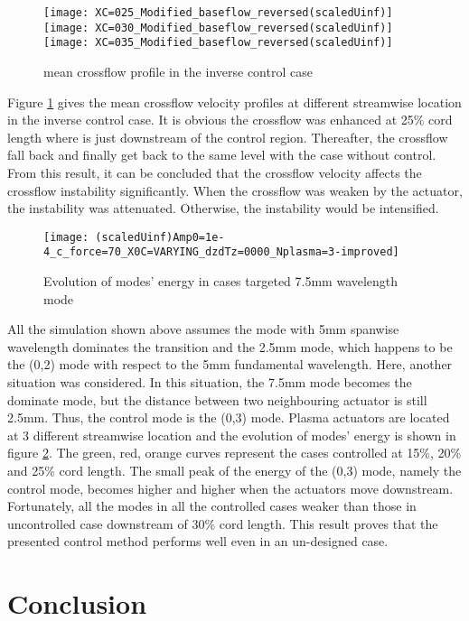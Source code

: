 \documentclass{AIAA}
\begin{document}
\begin{figure}
\centering
\texttt{[image: XC=025\_Modified\_baseflow\_reversed(scaledUinf)]}
\texttt{[image: XC=030\_Modified\_baseflow\_reversed(scaledUinf)]}
\texttt{[image: XC=035\_Modified\_baseflow\_reversed(scaledUinf)]}
\caption{mean crossflow profile in the inverse control case}%
\label{f:inverse_meanflow}
\end{figure}

Figure \ref{f:inverse_meanflow} gives the mean crossflow velocity profiles at different streamwise location in the inverse control case. It is obvious the crossflow was enhanced at 25\% cord length where is just downstream of the control region. Thereafter, the crossflow fall back and finally get back to the same level with the case without control. From this result, it can be concluded that the crossflow velocity affects the crossflow instability significantly. When the crossflow was weaken by the actuator, the instability was attenuated. Otherwise, the instability would be intensified.
\begin{figure}
\centering
\texttt{[image: (scaledUinf)Amp0=1e-4\_c\_force=70\_X0C=VARYING\_dzdTz=0000\_Nplasma=3-improved]}
\caption{Evolution of modes' energy in cases targeted 7.5mm wavelength mode}%
\label{f:7.5mm}
\end{figure}

All the simulation shown above assumes the mode with 5mm spanwise wavelength dominates the transition and the 2.5mm mode, which happens to be the (0,2) mode with respect to the 5mm fundamental wavelength. Here, another situation was considered. In this situation, the 7.5mm mode becomes the dominate mode, but the distance between two neighbouring actuator is still 2.5mm. Thus, the control mode is the (0,3) mode. Plasma actuators are located at 3 different streamwise location and the evolution of modes' energy is shown in figure \ref{f:7.5mm}. The green, red, orange curves represent the cases controlled at 15\%, 20\% and 25\% cord length. The small peak of the energy of the (0,3) mode, namely the control mode, becomes higher and higher when the actuators move downstream. Fortunately, all the modes in all the controlled cases weaker than those in uncontrolled case downstream of 30\% cord length. This result proves that the presented control method performs well even in an un-designed case.

\section{Conclusion}
\label{sec:conclusion}
\end{document}
